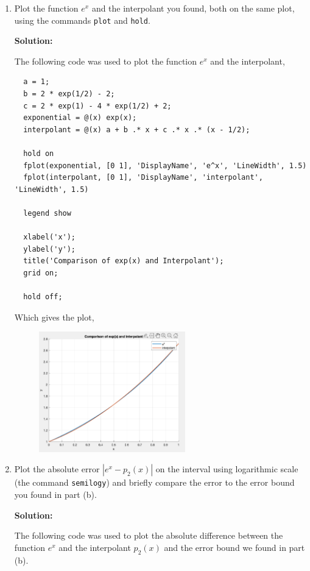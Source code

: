\documentclass[11pt]{article}
\newenvironment{solution}
  {\par\noindent\textbf{Solution:}\par}
  {\par}
\begin{document}
\begin{enumerate}
\begin{enumerate}
\begin{solution}
  Thus,
  $$  \text{max}_{s \in [0,1]} s(s-\frac{1}{2})(s-1) = \frac{\sqrt{3}}{36}$$

  Finally, the upperbound for the error is,
  $$ \therefore  \max_{0 \le x \le 1} | e^x - p_2(x)| = \frac{\sqrt{3}}{36} \cdot \frac{e}{6} = \frac{\sqrt{3}e}{216} $$

\end{solution}

\item Plot the function $e^x$ and the interpolant you found, both on the
same plot, using the commands {\tt plot} and  {\tt hold}.
\begin{solution}
  The following code was used to plot the function $e^x$ and the interpolant,
  \begin{verbatim}
  a = 1;
  b = 2 * exp(1/2) - 2;
  c = 2 * exp(1) - 4 * exp(1/2) + 2;
  exponential = @(x) exp(x);
  interpolant = @(x) a + b .* x + c .* x .* (x - 1/2);

  hold on
  fplot(exponential, [0 1], 'DisplayName', 'e^x', 'LineWidth', 1.5)
  fplot(interpolant, [0 1], 'DisplayName', 'interpolant', 'LineWidth', 1.5)

  legend show

  xlabel('x');
  ylabel('y');
  title('Comparison of exp(x) and Interpolant');
  grid on;

  hold off;
  \end{verbatim}
  Which gives the plot,
  \begin{figure}[H]
    \centering
    \includegraphics[width=0.6\textwidth]{q6c_plot.png} 
  \end{figure}
\end{solution}


\item Plot  the absolute error $|e^x - p_2(x)|$ on the interval using
logarithmic scale (the command {\tt semilogy}) and briefly compare
the error to the error bound you found in part (b).
\begin{solution}
  The following code was used to plot the absolute difference between the function $e^x$ 
  and the interpolant $p_2(x)$ and the error bound we found in  part (b).


\end{solution}
\end{enumerate}
\end{enumerate}
\end{document}
